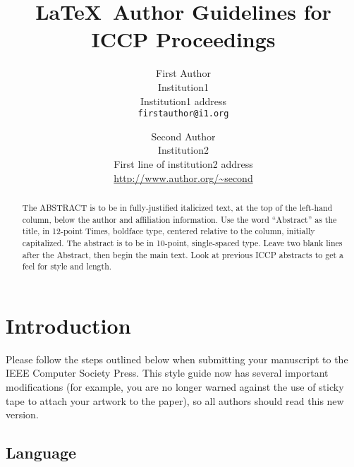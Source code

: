 \documentclass[10pt,twocolumn,letterpaper]{article}
\begin{document}
\title{\LaTeX\ Author Guidelines for ICCP Proceedings}

\author{First Author\\
Institution1\\
Institution1 address\\
{\tt\small firstauthor@i1.org}
\and
Second Author\\
Institution2\\
First line of institution2 address\\
{\small\url{http://www.author.org/~second}}
}

\maketitle
\thispagestyle{empty}

\begin{abstract}
   The ABSTRACT is to be in fully-justified italicized text, at the top
   of the left-hand column, below the author and affiliation
   information. Use the word ``Abstract'' as the title, in 12-point
   Times, boldface type, centered relative to the column, initially
   capitalized. The abstract is to be in 10-point, single-spaced type.
   Leave two blank lines after the Abstract, then begin the main text.
   Look at previous ICCP abstracts to get a feel for style and length.
\end{abstract}

\section{Introduction}

Please follow the steps outlined below when submitting your manuscript to
the IEEE Computer Society Press.  This style guide now has several
important modifications (for example, you are no longer warned against the
use of sticky tape to attach your artwork to the paper), so all authors
should read this new version.

\subsection{Language}
\end{document}
